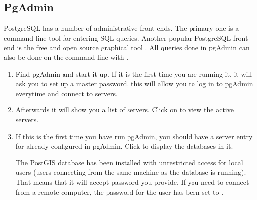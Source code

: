 \documentclass[a4paper,11pt,english]{sphinxmanual}
\begin{document}
\subsection{PgAdmin}
\label{\detokenize{setup:pgadmin}}
PostgreSQL has a number of administrative front-ends.  The primary one is  a command-line tool for entering SQL queries.  Another popular PostgreSQL front-end is the free and open source graphical tool . All queries done in pgAdmin can also be done on the command line with .
\begin{enumerate}
\def\theenumi{\arabic{enumi}}
\def\labelenumi{\theenumi .}
\makeatletter\def\p@enumii{\p@enumi \theenumi .}\makeatother
\item {} 
Find pgAdmin and start it up. If it is the first time you are running it, it will ask you to set up a master password, this will allow you to log in to pgAdmin everytime and connect to servers.

\noindent{}

\item {} 
Afterwards it will show you a list of servers. Click on  to view the active servers.

\noindent{}

\item {} 
If this is the first time you have run pgAdmin, you should have a server entry for  already configured in pgAdmin. Click to display the databases in it.

The PostGIS database has been installed with unrestricted access for local users (users connecting from the same machine as the database is running). That means that it will accept  password you provide. If you need to connect from a remote computer, the password for the  user has been set to .

\end{enumerate}
\end{document}
